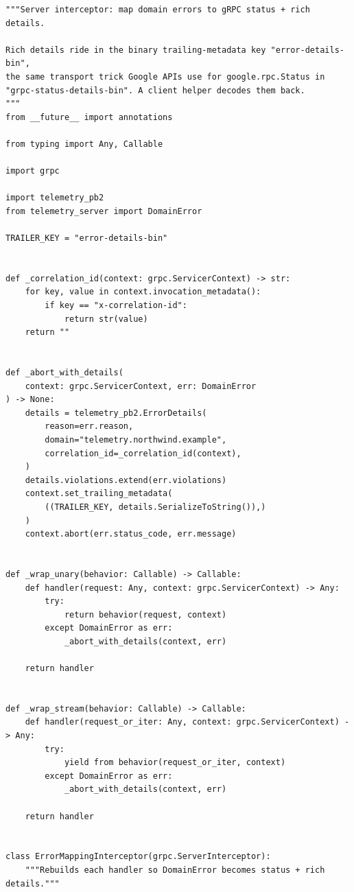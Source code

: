 \begin{verbatim}
"""Server interceptor: map domain errors to gRPC status + rich details.

Rich details ride in the binary trailing-metadata key "error-details-bin",
the same transport trick Google APIs use for google.rpc.Status in
"grpc-status-details-bin". A client helper decodes them back.
"""
from __future__ import annotations

from typing import Any, Callable

import grpc

import telemetry_pb2
from telemetry_server import DomainError

TRAILER_KEY = "error-details-bin"


def _correlation_id(context: grpc.ServicerContext) -> str:
    for key, value in context.invocation_metadata():
        if key == "x-correlation-id":
            return str(value)
    return ""


def _abort_with_details(
    context: grpc.ServicerContext, err: DomainError
) -> None:
    details = telemetry_pb2.ErrorDetails(
        reason=err.reason,
        domain="telemetry.northwind.example",
        correlation_id=_correlation_id(context),
    )
    details.violations.extend(err.violations)
    context.set_trailing_metadata(
        ((TRAILER_KEY, details.SerializeToString()),)
    )
    context.abort(err.status_code, err.message)


def _wrap_unary(behavior: Callable) -> Callable:
    def handler(request: Any, context: grpc.ServicerContext) -> Any:
        try:
            return behavior(request, context)
        except DomainError as err:
            _abort_with_details(context, err)

    return handler


def _wrap_stream(behavior: Callable) -> Callable:
    def handler(request_or_iter: Any, context: grpc.ServicerContext) -> Any:
        try:
            yield from behavior(request_or_iter, context)
        except DomainError as err:
            _abort_with_details(context, err)

    return handler


class ErrorMappingInterceptor(grpc.ServerInterceptor):
    """Rebuilds each handler so DomainError becomes status + rich details."""


\end{verbatim}
